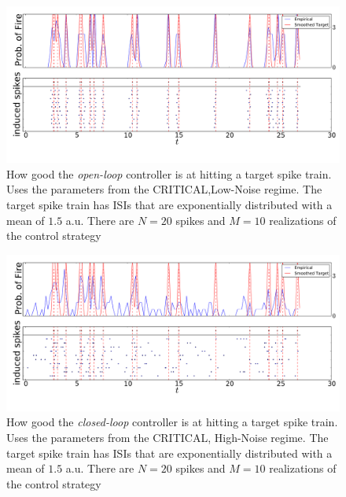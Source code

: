 \documentclass[12pt]{iopart}
\begin{document}
\begin{figure}[htp]
\begin{center}
  \includegraphics[width=.99\textwidth]{Figs/TrainController/CRITLN_ol_trains_sim_10.pdf}
  \caption[ ]{How good the {\sl open-loop} controller is at hitting a target
  spike train. Uses the parameters from the CRITICAL,Low-Noise regime. The
  target spike train has ISIs that are exponentially distributed with a
  mean of $1.5$ a.u. There are $N=20$ spikes and $M=10$ realizations of the
  control strategy}
  \label{fig:targettrain_ol_critlownoise}
\end{center}
\end{figure}
\begin{figure}[htp]
\begin{center}
  \includegraphics[width=.99\textwidth]{Figs/TrainController/CRITHN_cl_trains_sim_10.pdf}
  \caption[ ]{How good the {\sl closed-loop} controller is at hitting a target
  spike train. Uses the parameters from the CRITICAL, High-Noise regime. The
  target spike train has ISIs that are exponentially distributed with a
  mean of $1.5$ a.u. There are $N=20$ spikes and $M=10$ realizations of the
  control strategy}
  \label{fig:targettrain_cl_critlownoise}
\end{center}
\end{figure}
\end{document}
